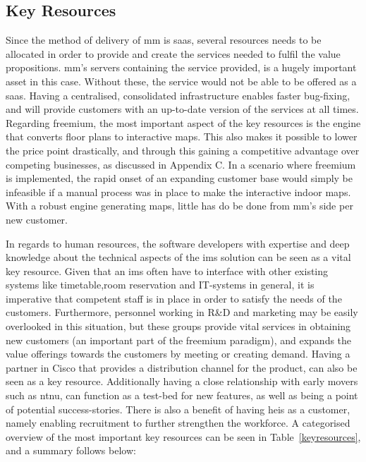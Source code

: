 \subsection{Key Resources}
Since the method of delivery of \gls{mm} is \gls{saas}, several resources needs to be allocated in order to provide and create the services needed to fulfil the value propositions. \gls{mm}'s servers containing the service provided, is a hugely important asset in this case. Without these, the service would not be able to be offered as a \gls{saas}. Having a centralised, consolidated infrastructure enables faster bug-fixing, and will provide customers with an up-to-date version of the services at all times. Regarding freemium, the most important aspect of the key resources is the engine that converts floor plans to interactive maps. This also makes it possible to lower the price point drastically, and through this gaining a competitive advantage over competing businesses, as discussed in Appendix C. In a scenario where freemium is implemented, the rapid onset of an expanding customer base would simply be infeasible if a manual process was in place to make the interactive indoor maps. With a robust engine generating maps, little has do be done from \gls{mm}'s side per new customer.


In regards to human resources, the software developers with expertise and deep knowledge about the technical aspects of the \gls{ims} solution can be seen as a vital key resource. Given that an \gls{ims} often have to interface with other existing systems like timetable,room reservation and IT-systems in general, it is imperative that competent staff is in place in order to satisfy the needs of the customers. Furthermore, personnel working in R\&D and marketing may be easily overlooked in this situation, but these groups provide vital services in obtaining new customers (an important part of the freemium paradigm), and expands the value offerings towards the customers by meeting or creating demand. Having a partner in Cisco that provides a distribution channel for the product, can also be seen as a key resource. Additionally having a close relationship with early movers such as \gls{ntnu}, can function as a test-bed for new features, as well as being a point of potential success-stories. There is also a benefit of having \glspl{hei} as a customer, namely enabling recruitment to further strengthen the workforce. A categorised overview of the most important key resources can be seen in Table~\ref{keyresources}, and a summary follows below:

